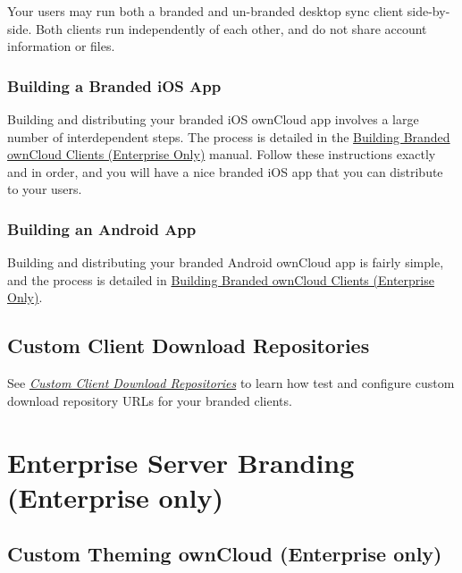 \documentclass[letterpaper,10pt,english]{sphinxmanual}
\begin{document}
Your users may run both a branded and un-branded desktop sync client
side-by-side. Both clients run independently of each other, and do not share
account information or files.


\subsubsection{Building a Branded iOS App}
\label{enterprise_clients/creating_branded_apps:building-a-branded-ios-app}
Building and distributing your branded iOS ownCloud app involves a large number
of interdependent steps. The process is detailed in the \href{https://doc.owncloud.com/branded\_clients/}{Building Branded
ownCloud Clients (Enterprise Only)} manual. Follow these instructions exactly
and in order, and you will have a nice branded iOS app that you can distribute
to your users.


\subsubsection{Building an Android App}
\label{enterprise_clients/creating_branded_apps:building-an-android-app}
Building and distributing your branded Android ownCloud app is fairly simple,
and the process is detailed in
\href{https://doc.owncloud.com/branded\_clients/}{Building Branded ownCloud Clients (Enterprise Only)}.


\subsection{Custom Client Download Repositories}
\label{enterprise_clients/custom_client_repos:building-branded-owncloud-clients-enterprise-only}\label{enterprise_clients/custom_client_repos::doc}\label{enterprise_clients/custom_client_repos:custom-client-download-repositories}
See {\hyperref[configuration_server/custom_client_repos::doc]{\emph{Custom Client Download Repositories}}} to learn how test and
configure custom download repository URLs for your branded clients.


\section{Enterprise Server Branding (Enterprise only)}
\label{enterprise_server_branding/index:enterprise-server-branding-enterprise-only}\label{enterprise_server_branding/index::doc}

\subsection{Custom Theming ownCloud (Enterprise only)}
\label{enterprise_server_branding/enterprise_server_branding::doc}\label{enterprise_server_branding/enterprise_server_branding:custom-theming-owncloud-enterprise-only}
\end{document}
